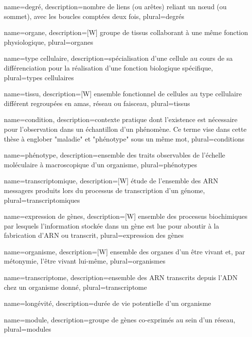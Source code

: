 {
	name={degré},
	description={nombre de liens (ou arêtes) reliant un nœud (ou sommet), avec les boucles comptées deux fois}, 
	plural={degrés}
}

{
	name={organe},
	description={[W] groupe de tissus collaborant à une même fonction physiologique}, 
	plural={organes}
}

{
	name={type cellulaire},
	description={spécialisation d'une cellule au cours de sa différenciation pour la réalisation d'une fonction biologique spécifique}, 
	plural={types cellulaires}
}

{
	name={tissu},
	description={[W] ensemble fonctionnel de cellules au type cellulaire différent regroupées en amas, réseau ou faisceau}, 
	plural={tissus}
}

{
	name={condition},
	description={contexte pratique dont l'existence est nécessaire pour l'observation dans un échantillon d'un phénomène. Ce terme vise dans cette thèse à englober "maladie" et "phénotype" sous un même mot}, 
	plural={conditions}
}

{
	name={phénotype},
	description={ensemble des traits observables de l'échelle moléculaire à macroscopique d'un organisme}, 
	plural={phénotypes}
}

{
	name={transcriptomique},
	description={[W] étude de l'ensemble des ARN messagers produits lors du processus de transcription d'un génome}, 
	plural={transcriptomiques}
}

{
	name={expression de gènes},
	description={[W] ensemble des processus biochimiques par lesquels l'information stockée dans un gène est lue pour aboutir à la fabrication d'ARN ou transcrit}, 
	plural={expression des gènes}
}

{
	name={organisme},
	description={[W] ensemble des organes d’un être vivant et, par métonymie, l'être vivant lui-même}, 
	plural={organismes}
}

{
	name={transcriptome},
	description={ensemble des ARN transcrits depuis l'ADN chez un organisme donné}, 
	plural={transcriptome}
}

{
	name={longévité},
	description={durée de vie potentielle d'un organisme}
}

{
	name={module},
	description={groupe de gènes co-exprimés au sein d'un réseau}, 
	plural={modules}
}

